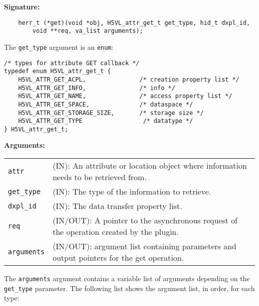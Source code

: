 \begin{mdframed}[style=bgbox]
\textbf{Signature:}
\begin{lstlisting}
    herr_t (*get)(void *obj, H5VL_attr_get_t get_type, hid_t dxpl_id, 
        void **req, va_list arguments);
\end{lstlisting}

The \texttt{get\_type} argument is an \texttt{enum}:
\begin{lstlisting}
/* types for attribute GET callback */
typedef enum H5VL_attr_get_t {
    H5VL_ATTR_GET_ACPL,               /* creation property list */
    H5VL_ATTR_GET_INFO,               /* info */
    H5VL_ATTR_GET_NAME,               /* access property list */
    H5VL_ATTR_GET_SPACE,              /* dataspace */
    H5VL_ATTR_GET_STORAGE_SIZE,       /* storage size */
    H5VL_ATTR_GET_TYPE                 /* datatype */
} H5VL_attr_get_t;
\end{lstlisting}

\textbf{Arguments:}\\
\begin{tabular}{l p{10cm}}
  \texttt{attr} & (IN): An attribute or location object where information
  needs to be retrieved from.\\
  \texttt{get\_type} & (IN): The type of the information to retrieve.\\
  \texttt{dxpl\_id} & (IN): The data transfer property list.\\
  \texttt{req} & (IN/OUT): A pointer to the asynchronous request of the
  operation created by the plugin.\\
  \texttt{arguments} & (IN/OUT): argument list containing parameters and
  output pointers for the get operation. \\
\end{tabular}
\end{mdframed}

The \texttt{arguments} argument contains a variable list of arguments
depending on the \texttt{get\_type} parameter. The following list shows
the argument list, in order, for each type:

